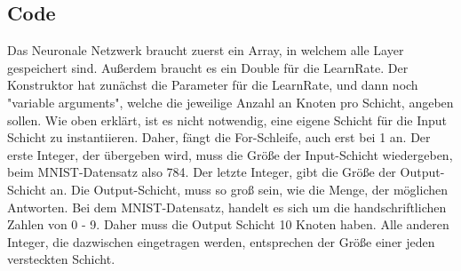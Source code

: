 \documentclass[12pt]{article}
\begin{document}
\subsection{Code}
Das Neuronale Netzwerk braucht zuerst ein Array, in welchem alle Layer gespeichert sind. Außerdem braucht es ein Double für die LearnRate. Der Konstruktor hat zunächst die Parameter für die LearnRate, und dann noch "variable arguments", welche die jeweilige Anzahl an Knoten pro Schicht, angeben sollen. Wie oben erklärt, ist es nicht notwendig, eine eigene Schicht für die Input Schicht zu instantiieren. Daher, fängt die For-Schleife, auch erst bei 1 an. Der erste Integer, der übergeben wird, muss die Größe der Input-Schicht wiedergeben, beim MNIST-Datensatz also 784. Der letzte Integer, gibt die Größe der Output-Schicht an. Die Output-Schicht, muss so groß sein, wie die Menge, der möglichen Antworten. Bei dem MNIST-Datensatz, handelt es sich um die handschriftlichen Zahlen von 0 - 9. Daher muss die Output Schicht 10 Knoten haben. Alle anderen Integer, die dazwischen eingetragen werden, entsprechen der Größe einer jeden versteckten Schicht.
\end{document}
